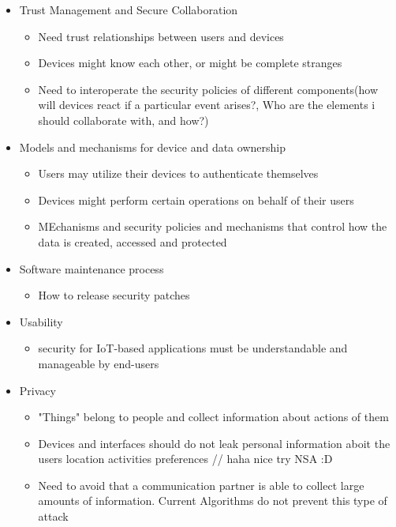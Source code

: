 \documentclass[a4paper, 12pt]{article}
\begin{document}
\begin{itemize}
\begin{itemize}
\end{itemize}
\item Trust Management and Secure Collaboration
\begin{itemize}
\item Need trust relationships between users and devices
\item Devices might know each other, or might be complete stranges
\item Need to interoperate the security policies of different components(how will devices react if a particular event arises?, Who are the elements i should collaborate with, and how?)
\end{itemize}
\item Models and mechanisms for device and data ownership
\begin{itemize}
\item Users may utilize their devices to authenticate themselves
\item Devices might perform certain operations on behalf of their users
\item MEchanisms and security policies and mechanisms that control how the data is created, accessed and protected
\end{itemize}
\item Software maintenance process
\begin{itemize}
\item How to release security patches
\end{itemize}
\item Usability
\begin{itemize}
\item security for IoT-based applications must be understandable and manageable by end-users
\end{itemize}
\item Privacy
\begin{itemize}
\item "Things" belong to people and collect information about actions of them
\item Devices and interfaces should do not leak personal information aboit the users location activities preferences // haha nice try NSA :D
\item Need to avoid that a communication partner is able to collect large amounts of information. Current Algorithms do not prevent this type of attack
\end{itemize}
\end{itemize}
\end{document}
